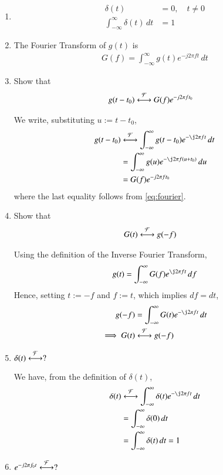 \documentclass[journal,12pt,twocolumn]{IEEEtran}
\renewcommand\thesection{\arabic{section}}
\begin{document}
	\begin{enumerate}[label=\thesection.\arabic*
		,ref=\thesection.\theenumi]
		\item 
		\begin{align}
			\delta(t)&=0, \quad t\neq 0 \\
			\int_{-\infty}^{\infty}\delta(t) \, dt&= 1
		\end{align}
		\item The Fourier Transform of $g(t)$ is
		\begin{align}
			G(f)=\int_{-\infty}^{\infty}g(t)e^{-j2\pi ft}\,dt
			\label{eq:fourier}
		\end{align}
		\item Show that 
		\begin{align}
			g(t-t_0)&\overset{\mathcal{F}}{ \longleftrightarrow}G(f)e^{-j2\pi ft_0}
			\label{eq:t-shift}
		\end{align}
		
		\solution We write, substituting $u := t-t_0$,
		\begin{align}
			g(t-t_0)&\system{F}\int_{-\infty}^{\infty}
			g(t-t_0)e^{-\j2\pi ft}\,dt \\
			&=\int_{-\infty}^{\infty}
			g(u)e^{-\j2\pi f(u + t_0)}\,du \\
			&=G(f)e^{-j2\pi ft_0}
		\end{align}
		where the last equality follows from \eqref{eq:fourier}.
		\item Show that
		\begin{align}
			G(t)&\overset{\mathcal{F}}{ \longleftrightarrow}g(-f)
		\end{align}
		
		\solution Using the definition of the Inverse Fourier Transform,
		\begin{align}
			g(t)=\int_{-\infty}^{\infty}G(f)e^{\j2\pi ft}\,df
			\label{eq:duality}
		\end{align}
		Hence, setting $t := -f$ and $f := t$, which implies $df = dt$,
		\begin{align}
			g(-f)&=\int_{-\infty}^{\infty}G(t)e^{-\j2\pi ft}\,dt \\
			\implies G(t)&\system{F}g(-f)
		\end{align}
		\item $\delta(t)\overset{\mathcal{F}}{ \longleftrightarrow}?$
		
		\solution We have, from the definition of $\delta(t)$,
		\begin{align}
			\delta(t)&\system{F}\int_{-\infty}^{\infty}\delta(t)e^{-\j2\pi ft}\, dt \\
			&=\int_{-\infty}^{\infty}\delta(0)\, dt \\
			&=\int_{-\infty}^{\infty}\delta(t)\, dt = 1
			\label{eq:fourier-delta}
		\end{align}
		\item $e^{-j2\pi f_0t}\overset{\mathcal{F}}{ \longleftrightarrow}?$
		

\end{enumerate}
\end{document}

